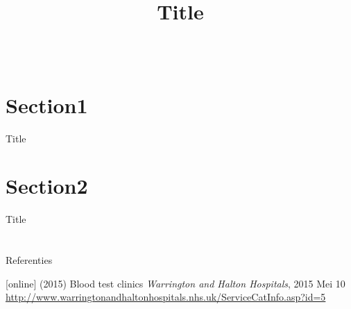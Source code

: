 \documentclass[mathserif,11pt]{beamer}
\title[Katholieke Universiteit Leuven]{\Huge Title}
\date{}
\newcommand{\footlineextra}[1]{\gdef\insertfootlineextra{#1}}
\begin{document}
\begin{frame}
\begin{columns}[c]


	\vspace{1cm}

    \titlepage



	\end{columns}

\end{frame}


\section{Section1}
	\begin{frame}{Title}
		\footlineextra{Bron:}

	\end{frame}

\section{Section2}

    \begin{frame}{Title}
      \footlineextra{Bron:}

    \end{frame}

\section{}
\begin{frame}{Referenties}


\begin{thebibliography}{99} %
[online]
 (2015) Blood test clinics
\newblock  \emph{Warrington and Halton Hospitals}, 2015 Mei 10
\newblock \url{http://www.warringtonandhaltonhospitals.nhs.uk/ServiceCatInfo.asp?id=5}
\end{thebibliography}

\end{frame}
\end{document}
